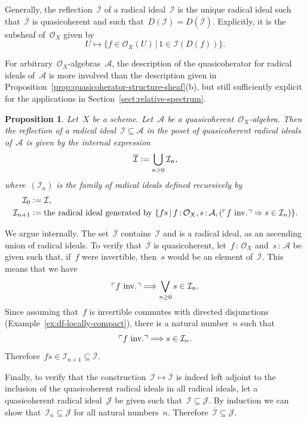 \documentclass[10pt,reqno,a4paper]{amsbook}
\makeatletter
\theoremstyle{definition}
\theoremstyle{plain}
\newtheorem{prop}[defn]{Proposition}
\theoremstyle{remark}
\newcommand{\A}{\mathcal{A}}
\renewcommand{\O}{\mathcal{O}}
\newcommand{\I}{\mathcal{I}}
\newcommand{\J}{\mathcal{J}}
\newcommand{\?}{\,{:}\,}
\renewcommand{\_}{\mathpunct{.}\,}
\newcommand{\speak}[1]{\ulcorner\text{\textnormal{#1}}\urcorner}
\newcommand{\inv}{inv.\@}
\newcommand{\defeq}{\vcentcolon=}
\renewenvironment{proof}[1][\proofname]{\par
  \pushQED{\qed}%
  \normalfont \topsep6\p@\@plus6\p@\relax
  \trivlist
  \item[\hskip\labelsep
        \itshape
    #1\@addpunct{.}]\ignorespaces
}{%
  \popQED\endtrivlist\@endpefalse
}
\makeatother
\begin{document}
Generally, the reflection~$\overline{\I}$ of a radical ideal~$\I$ is the unique
radical ideal such that~$\overline{\I}$ is quasicoherent and such that~$D(\I) =
D(\overline{\I})$. Explicitly, it is the subsheaf of~$\O_X$ given by
\[ U \longmapsto \{ f \in \O_X(U) \,|\, 1 \in \I(D(f)) \}. \]

For arbitrary~$\O_X$-algebras~$\A$, the description of the quasicoherator for
radical ideals of~$\A$ is more involved than the description given in
Proposition~\ref{prop:quasicoherator-structure-sheaf}(b), but still
sufficiently explicit for the applications in
Section~\ref{sect:relative-spectrum}.

\begin{prop}\label{prop:quasicoherator-arbitrary-algebra}
Let~$X$ be a scheme. Let~$\A$ be a quasicoherent~$\O_X$-algebra.
Then the reflection of a radical ideal~$\I \subseteq \A$ in the poset of
quasicoherent radical ideals of~$\A$ is given by the internal expression
\[ \overline{\I} \defeq \bigcup_{n \geq 0} \I_n, \]
where~$(\I_n)$ is the family of radical ideals defined recursively by
\begin{align*}
  \I_0 &\defeq \I, \\
  \I_{n+1} &\defeq \textnormal{the radical ideal generated by
  $\{ fs \,|\, f\?\O_X, s\?\A, (\speak{$f$ \inv} \Rightarrow s \in \I_n) \}$}.
\end{align*}
\end{prop}
\begin{proof}We argue internally. The set~$\overline{\I}$ contains~$\I$ and is
a radical ideal, as an ascending union of radical ideals. To verify
that~$\overline{\I}$ is quasicoherent, let~$f\?\O_X$ and~$s\?\A$ be given such
that, if~$f$ were invertible, then~$s$ would be an element of~$\overline{\I}$.
This means that we have
\[ \speak{$f$ \inv} \Longrightarrow \bigvee_{n \geq 0} s \in \I_n. \]
Since assuming that~$f$ is invertible commutes with directed disjunctions
(Example~\ref{ex:df-locally-compact}), there is a natural number~$n$ such that
\[ \speak{$f$ \inv} \Longrightarrow s \in \I_n. \]
Therefore~$fs \in \I_{n+1} \subseteq \overline{\I}$.

Finally, to verify that the construction~$\I \mapsto \overline{\I}$ is indeed
left adjoint to the inclusion of the quasicoherent radical ideals in all
radical ideals, let a quasicoherent radical ideal~$\J$ be given such that~$\I
\subseteq \J$. By induction we can show that~$\I_n \subseteq \J$ for all
natural numbers~$n$. Therefore~$\overline{\I} \subseteq \J$.
\end{proof}
\end{document}

